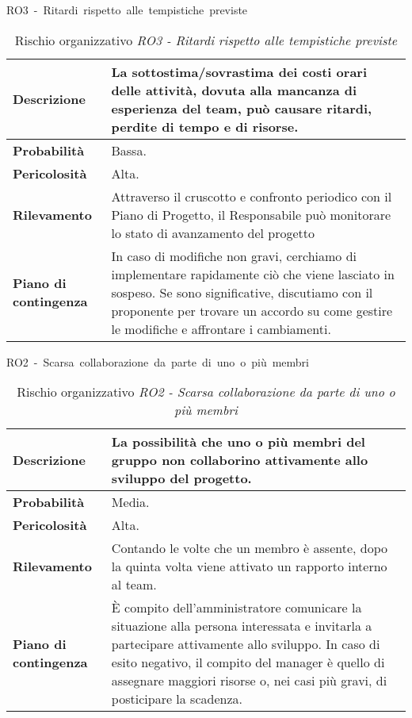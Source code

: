 \begin{table}[!h]
    \centering
    \hbox{RO3 - Ritardi rispetto alle tempistiche previste}
    \vspace{0.3cm}
	\begin{tabular}{|l|p{10cm}|} 
		\hline
		\textbf{Descrizione} & La sottostima/sovrastima dei costi orari delle attività, dovuta alla mancanza di esperienza del team, può causare ritardi, perdite di tempo e di risorse. \\ 
        \hline
        \textbf{Probabilità} & Bassa. \\
        \hline
        \textbf{Pericolosità} & Alta. \\
        \hline
        \textbf{Rilevamento} & Attraverso il cruscotto e confronto periodico con il Piano di Progetto, il Responsabile può monitorare lo stato di avanzamento del progetto \\
        \hline
        \textbf{Piano di contingenza} & In caso di modifiche non gravi, cerchiamo di implementare rapidamente ciò che viene lasciato in sospeso. Se sono significative, discutiamo con il proponente per trovare un accordo su come gestire le modifiche e affrontare i cambiamenti.\\
		\hline
	\end{tabular}
    \caption{Rischio organizzativo \textit{RO3 - Ritardi rispetto alle tempistiche previste}}
    \label{table:3}
\end{table}
\begin{table}[!h]
    \centering
    \hbox{RO2 - Scarsa collaborazione da parte di uno o più membri}
    \vspace{0.3cm}
	\begin{tabular}{|l|p{10cm}|} 
		\hline
		\textbf{Descrizione} & La possibilità che uno o più membri del gruppo non collaborino attivamente allo sviluppo del progetto. \\ 
        \hline
        \textbf{Probabilità} & Media. \\
        \hline
        \textbf{Pericolosità} & Alta. \\
        \hline
        \textbf{Rilevamento} & Contando le volte che un membro è assente, dopo la quinta volta viene attivato un rapporto interno al team.\\
        \hline
        \textbf{Piano di contingenza} & È compito dell'amministratore comunicare la situazione alla persona interessata e invitarla a partecipare attivamente allo sviluppo. In caso di esito negativo, il compito del manager è quello di assegnare maggiori risorse o, nei casi più gravi, di posticipare la scadenza.\\
		\hline
	\end{tabular}
    \caption{Rischio organizzativo \textit{RO2 - Scarsa collaborazione da parte di uno o più membri}}
    \label{table:4}
\end{table}

